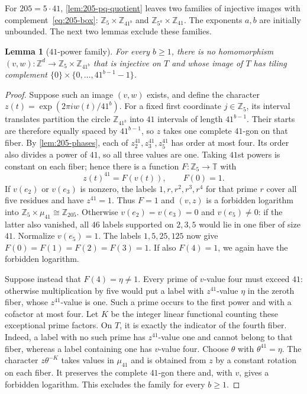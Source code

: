 \documentclass[11pt,reqno]{amsart}
\newcommand{\Z}{\mathbb Z}
\newcommand{\T}{\mathbb T}
\newtheorem{lemma}[theorem]{Lemma}
\theoremstyle{definition}
\theoremstyle{remark}
\numberwithin{equation}{section}
\begin{document}
For $205=5\cdot41$, \cref{lem:205-pq-quotient} leaves two families
of injective images with complement~\eqref{eq:205-box}:
$\Z_5\times\Z_{41^b}$ and $\Z_{5^a}\times\Z_{41}$.
The exponents $a,b$ are initially unbounded. The next two lemmas
exclude these families.

\begin{lemma}[$41$-power family]\label{lem:205-41-family}
For every $b\ge1$, there is no homomorphism
$(v,w):\Z^d\to\Z_5\times\Z_{41^b}$ that is injective on $T$ and
whose image of $T$ has tiling complement
$\{0\}\times\{0,\ldots,41^{b-1}-1\}$.
\end{lemma}

\begin{proof}
Suppose such an image $(v,w)$ exists, and define the character
$z(t)=\exp(2\pi i w(t)/41^b)$.
For a fixed first coordinate $j\in\Z_5$, its interval translates
partition the circle $\Z_{41^b}$ into $41$ intervals of length
$41^{b-1}$. Their starts are therefore equally spaced by $41^{b-1}$,
so $z$ takes one complete $41$-gon on that fiber.
By \cref{lem:205-phases}, each of $z_2^{41},z_3^{41},z_5^{41}$ has
order at most four. Its order also divides a power of $41$, so all
three values are one. Taking $41$st powers is constant on each
fiber; hence there is a function $F:\Z_5\to\T$ with
\[
 z(t)^{41}=F(v(t)),\qquad F(0)=1.
\]
If $v(e_2)$ or $v(e_3)$ is nonzero, the labels $1,r,r^2,r^3,r^4$
for that prime $r$ cover all five residues and have $z^{41}=1$.
Thus $F=1$ and $(v,z)$ is a forbidden logarithm into
$\Z_5\times\mu_{41}\cong\Z_{205}$.
Otherwise $v(e_2)=v(e_3)=0$ and $v(e_5)\ne0$: if the latter also
vanished, all $46$ labels supported on $2,3,5$ would lie in one
fiber of size $41$. Normalize $v(e_5)=1$.
The labels $1,5,25,125$ now give $F(0)=F(1)=F(2)=F(3)=1$.
If also $F(4)=1$, we again have the forbidden logarithm.

Suppose instead that $F(4)=\eta\ne1$. Every prime of $v$-value four
must exceed $41$: otherwise multiplication by five would put a label
with $z^{41}$-value $\eta$ in the zeroth fiber, whose $z^{41}$-value is one.
Such a prime occurs to the first power and with a cofactor at most four.
Let $K$ be the integer linear functional counting these exceptional
prime factors. On $T$, it is exactly the indicator of the fourth
fiber. Indeed, a label with no such prime has $z^{41}$-value one and cannot
belong to that fiber, whereas a label containing one has $v$-value four.
Choose $\theta$ with $\theta^{41}=\eta$. The character
$z\theta^{-K}$ takes values in $\mu_{41}$ and is obtained from $z$
by a constant rotation on each fiber. It preserves the complete
$41$-gon there and, with $v$, gives a forbidden logarithm.
This excludes the family for every $b\ge1$.
\end{proof}
\end{document}
